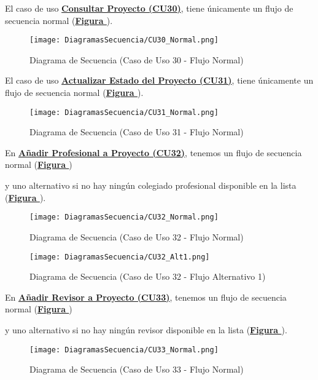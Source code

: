 \addtocounter{figura}{1} \pagebreak
El caso de uso \textbf{\hyperref[tab:curConsultarProyectos]{Consultar Proyecto (CU30)}}, tiene únicamente un flujo de secuencia normal (\textbf{\hyperref[fig:Secuencia_CU30_Normal]{Figura }}).
\begin{figure}[!htbp]
  \centering
  \texttt{[image: DiagramasSecuencia/CU30\_Normal.png]}
  \caption{Diagrama de Secuencia (Caso de Uso 30 - Flujo Normal)}
  \label{fig:Secuencia_CU30_Normal}
\end{figure}
\FloatBarrier

\addtocounter{figura}{1}
El caso de uso \textbf{\hyperref[tab:curActualizarProyecto]{Actualizar Estado del Proyecto (CU31)}}, tiene únicamente un flujo de secuencia normal (\textbf{\hyperref[fig:Secuencia_CU31_Normal]{Figura }}).
\begin{figure}[!htbp]
  \centering
  \texttt{[image: DiagramasSecuencia/CU31\_Normal.png]}
  \caption{Diagrama de Secuencia (Caso de Uso 31 - Flujo Normal)}
  \label{fig:Secuencia_CU31_Normal}
\end{figure}
\FloatBarrier

\addtocounter{figura}{1} \pagebreak
En \textbf{\hyperref[tab:curAsignarProfProyecto]{Añadir Profesional a Proyecto (CU32)}}, tenemos un flujo de secuencia normal (\textbf{\hyperref[fig:Secuencia_CU32_Normal]{Figura }}) \addtocounter{figura}{1} y uno alternativo si no hay ningún colegiado profesional disponible en la lista (\textbf{\hyperref[fig:Secuencia_CU32_Alt1]{Figura }}).
\begin{figure}[!htbp]
  \centering
  \texttt{[image: DiagramasSecuencia/CU32\_Normal.png]}
  \caption{Diagrama de Secuencia (Caso de Uso 32 - Flujo Normal)}
  \label{fig:Secuencia_CU32_Normal}
\end{figure}
\FloatBarrier

\begin{figure}[!htbp]
  \centering
  \texttt{[image: DiagramasSecuencia/CU32\_Alt1.png]}
  \caption{Diagrama de Secuencia (Caso de Uso 32 - Flujo Alternativo 1)}
  \label{fig:Secuencia_CU32_Alt1}
\end{figure}
\FloatBarrier

\addtocounter{figura}{1} \pagebreak
En \textbf{\hyperref[tab:curAsignarRevisorProyecto]{Añadir Revisor a Proyecto (CU33)}}, tenemos un flujo de secuencia normal (\textbf{\hyperref[fig:Secuencia_CU33_Normal]{Figura }}) \addtocounter{figura}{1} y uno alternativo si no hay ningún revisor disponible en la lista (\textbf{\hyperref[fig:Secuencia_CU33_Alt1]{Figura }}).
\begin{figure}[!htbp]
  \centering
  \texttt{[image: DiagramasSecuencia/CU33\_Normal.png]}
  \caption{Diagrama de Secuencia (Caso de Uso 33 - Flujo Normal)}
  \label{fig:Secuencia_CU33_Normal}
\end{figure}
\FloatBarrier

